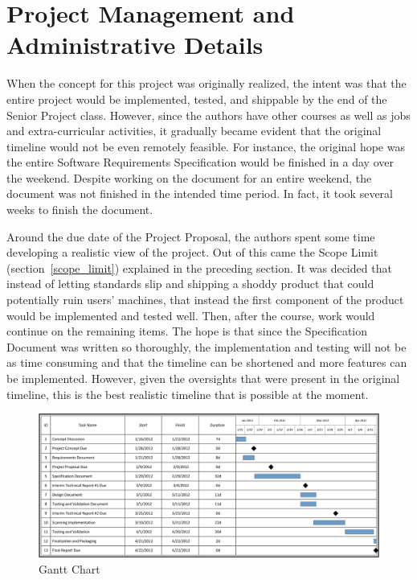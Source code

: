\documentclass[letterpaper,12pt]{article}
\begin{document}
\section{Project Management and Administrative Details}
\label{project_management} 
When the concept for this project was originally realized, the intent was that
the entire project would be implemented, tested, and shippable by the end of the
Senior Project class.  However, since the authors have other courses as well as
jobs and extra-curricular activities, it gradually became evident that the
original timeline would not be even remotely feasible.  For instance, the
original hope was the entire Software Requirements Specification
\cite{Specification} would be finished in a day over the weekend.  Despite
working on the document for an entire weekend, the document was not finished in
the intended time period.  In fact, it took several weeks to finish the
document.  

Around the due date of the Project Proposal, the authors spent some time
developing a realistic view of the project.  Out of this came the Scope Limit
(section~\ref{scope_limit}) explained in the preceding section.  It was decided
that instead of letting standards slip and shipping a shoddy product that could
potentially ruin users' machines, that instead the first component of the
product would be implemented and tested well.  Then, after the course, work
would continue on the remaining items.  The hope is that since the Specification
Document was written so thoroughly, the implementation and testing will not be
as time consuming and that the timeline can be shortened and more features can
be implemented.  However, given the oversights that were present in the original
timeline, this is the best realistic timeline that is possible at the moment.  

\begin{figure}[h]
  	\centering
	\includegraphics[scale=.7]{figures/GanttChart.png}
  	\caption{Gantt Chart}
  	\label{gantt}
\end{figure}
\end{document}
